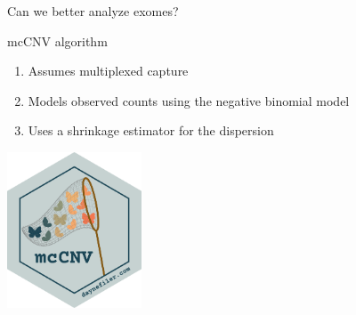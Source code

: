 \documentclass[
  10pt,
  ignorenonframetext,
  m]{beamer}
\providecommand{\tightlist}{%
  \setlength{\itemsep}{0pt}\setlength{\parskip}{0pt}}
\begin{document}
\begin{frame}{Can we better analyze exomes?}
\protect\hypertarget{can-we-better-analyze-exomes}{}

\begin{block}{mcCNV algorithm}

\medskip

\begin{enumerate}
\tightlist
\item
  Assumes multiplexed capture
\item
  Models observed counts using the negative binomial model
\item
  Uses a shrinkage estimator for the dispersion
\end{enumerate}

\medskip

\hfill \includegraphics[width=0.3\textwidth,height=\textheight]{images/mcCNV.png}

\end{block}

\end{frame}
\end{document}
